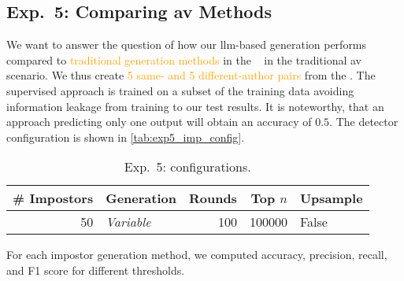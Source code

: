 \subsection{Exp.\ 5: Comparing \acs{av} Methods}%
\label{subsec:imp_gen}

We want to answer the question of how our \ac{llm}-based \imp{} generation performs compared to \textcolor{orange}{traditional \imp{} generation methods} in the \impAppr{}~\citep{koppel_determining_2014} %
in the traditional \ac{av} scenario.
We thus create \textcolor{orange}{5 same- and 5 different-author pairs} from the \dataStudent{}. %
The supervised approach is trained on a subset of the training data avoiding information leakage from training to our test results.
It is noteworthy, that an approach predicting only one output will obtain an accuracy of $0.5$.
The \impAppr{} 
detector configuration is shown in \autoref{tab:exp5_imp_config}. %

\begin{table}[h]
\centering\small
\caption{Exp.\ 5: \impAppr{} configurations.}
\label{tab:exp5_imp_config}
\begin{tabular}{@{}rlrrl@{}}   %
\toprule
\# Impostors & Generation & Rounds & Top $n$ & Upsample \\
\midrule
50 & \textit{Variable} & 100 & \num{100000} & False \\
\bottomrule
\end{tabular}%
\end{table}


For each impostor generation method, we computed accuracy, precision, recall, and F1 score for different thresholds. 
